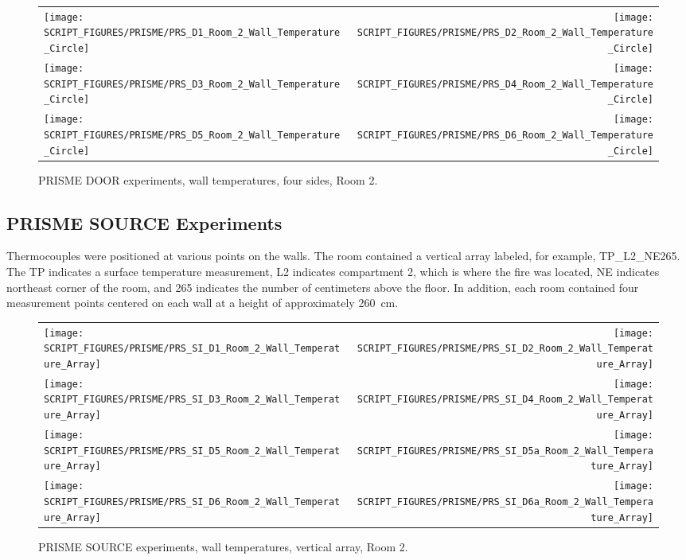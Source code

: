 \begin{figure}[p]
\begin{tabular*}{\textwidth}{l@{\extracolsep{\fill}}r}
\texttt{[image: SCRIPT\_FIGURES/PRISME/PRS\_D1\_Room\_2\_Wall\_Temperature\_Circle]} &
\texttt{[image: SCRIPT\_FIGURES/PRISME/PRS\_D2\_Room\_2\_Wall\_Temperature\_Circle]} \\
\texttt{[image: SCRIPT\_FIGURES/PRISME/PRS\_D3\_Room\_2\_Wall\_Temperature\_Circle]} &
\texttt{[image: SCRIPT\_FIGURES/PRISME/PRS\_D4\_Room\_2\_Wall\_Temperature\_Circle]} \\
\texttt{[image: SCRIPT\_FIGURES/PRISME/PRS\_D5\_Room\_2\_Wall\_Temperature\_Circle]} &
\texttt{[image: SCRIPT\_FIGURES/PRISME/PRS\_D6\_Room\_2\_Wall\_Temperature\_Circle]}
\end{tabular*}
\caption{PRISME DOOR experiments, wall temperatures, four sides, Room 2.}
\label{PRISME_Wall_Circle_Room_2}
\end{figure}

\clearpage

\subsection{PRISME SOURCE Experiments}

Thermocouples were positioned at various points on the walls. The room contained a vertical array labeled, for example, TP\_L2\_NE265. The TP indicates a surface temperature measurement, L2 indicates compartment 2, which is where the fire was located, NE indicates northeast corner of the room, and 265 indicates the number of centimeters above the floor. In addition, each room contained four measurement points centered on each wall at a height of approximately 260~cm.

\begin{figure}[!ht]
\begin{tabular*}{\textwidth}{l@{\extracolsep{\fill}}r}
\texttt{[image: SCRIPT\_FIGURES/PRISME/PRS\_SI\_D1\_Room\_2\_Wall\_Temperature\_Array]} &
\texttt{[image: SCRIPT\_FIGURES/PRISME/PRS\_SI\_D2\_Room\_2\_Wall\_Temperature\_Array]} \\
\texttt{[image: SCRIPT\_FIGURES/PRISME/PRS\_SI\_D3\_Room\_2\_Wall\_Temperature\_Array]} &
\texttt{[image: SCRIPT\_FIGURES/PRISME/PRS\_SI\_D4\_Room\_2\_Wall\_Temperature\_Array]} \\
\texttt{[image: SCRIPT\_FIGURES/PRISME/PRS\_SI\_D5\_Room\_2\_Wall\_Temperature\_Array]} &
\texttt{[image: SCRIPT\_FIGURES/PRISME/PRS\_SI\_D5a\_Room\_2\_Wall\_Temperature\_Array]} \\
\texttt{[image: SCRIPT\_FIGURES/PRISME/PRS\_SI\_D6\_Room\_2\_Wall\_Temperature\_Array]} &
\texttt{[image: SCRIPT\_FIGURES/PRISME/PRS\_SI\_D6a\_Room\_2\_Wall\_Temperature\_Array]}
\end{tabular*}
\caption{PRISME SOURCE experiments, wall temperatures, vertical array, Room 2.}
\label{PRISME_SOURCE_Wall_Array_Room_2}
\end{figure}

